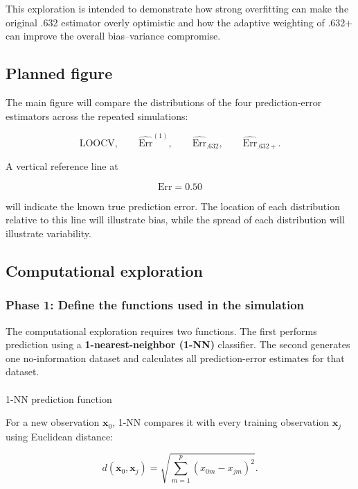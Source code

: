 \documentclass[
  letterpaper,
  DIV=11,
  numbers=noendperiod]{scrreprt}
\makeatletter
\let\oldparagraph\paragraph
\renewcommand{\paragraph}{
    \@ifstar
      \xxxParagraphStar
      \xxxParagraphNoStar
  }
\newcommand{\xxxParagraphStar}[1]{\oldparagraph*{#1}\mbox{}}
\newcommand{\xxxParagraphNoStar}[1]{\oldparagraph{#1}\mbox{}}
\makeatother
\begin{document}
This exploration is intended to demonstrate how strong overfitting can
make the original .632 estimator overly optimistic and how the adaptive
weighting of .632+ can improve the overall bias--variance compromise.

\subsection{Planned figure}\label{planned-figure-1}

The main figure will compare the distributions of the four
prediction-error estimators across the repeated simulations:

\[
\text{LOOCV},
\qquad
\widehat{\mathrm{Err}}^{(1)},
\qquad
\widehat{\mathrm{Err}}_{.632},
\qquad
\widehat{\mathrm{Err}}_{.632+}.
\]

A vertical reference line at

\[
\mathrm{Err}=0.50
\]

will indicate the known true prediction error. The location of each
distribution relative to this line will illustrate bias, while the
spread of each distribution will illustrate variability.

\subsection{Computational
exploration}\label{computational-exploration-1}

\subsubsection{Phase 1: Define the functions used in the
simulation}\label{phase-1-define-the-functions-used-in-the-simulation}

The computational exploration requires two functions. The first performs
prediction using a \textbf{1-nearest-neighbor (1-NN)} classifier. The
second generates one no-information dataset and calculates all
prediction-error estimates for that dataset.

\paragraph{1-NN prediction function}\label{nn-prediction-function}

For a new observation \(\mathbf{x}_0\), 1-NN compares it with every
training observation \(\mathbf{x}_j\) using Euclidean distance:

\[
d(\mathbf{x}_0,\mathbf{x}_j)
=
\sqrt{
\sum_{m=1}^{p}
(x_{0m}-x_{jm})^2
}.
\]
\end{document}
